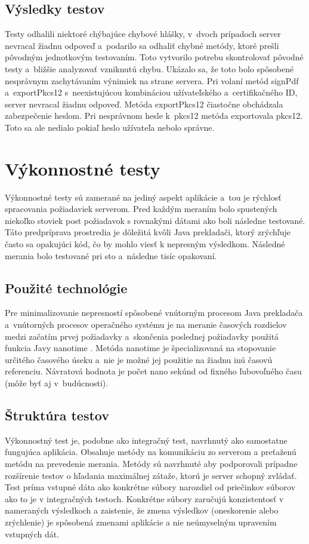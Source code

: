 \documentclass[
  digital, %
  table,   %
oneside,
  nolof,     %
  nolot,     %
]{fithesis3}
\begin{document}
\subsection{Výsledky testov}
Testy odhalili niektoré chýbajúce chybové hlášky, v~dvoch prípadoch server nevracal žiadnu odpoveď a~podarilo sa odhaliť chybné metódy, ktoré prešli pôvodným jednotkovým testovaním.
Toto vytvorilo potrebu skontrolovať pôvodné testy a~bližšie analyzovať vzniknutú chybu. Ukázalo sa, že toto bolo spôsobené nesprávnym zachytávaním výnimiek na strane servera.
Pri volaní metód signPdf a~exportPkcs12 s~neexistujúcou kombináciou užívateľského a~certifikačného ID, server nevracal žiadnu odpoveď. Metóda exportPkcs12 čiastočne obchádzala zabezpečenie heslom. Pri nesprávnom hesle k~pkcs12 metóda exportovala pkcs12. Toto sa ale nedialo pokiaľ heslo užívateľa nebolo správne.
\section{Výkonnostné testy}
Výkonnostné testy sú zamerané na jediný aspekt aplikácie a~tou je rýchlosť spracovania požiadaviek serverom. Pred každým meraním bolo spustených niekoľko stoviek post požiadavok s rovnakými dátami ako boli následne testované. Táto predpríprava prostredia je dôležitá kvôli Java prekladači, ktorý zrýchľuje často sa opakujúci kód, čo by mohlo viesť k nepresným výsledkom. Následné merania bolo  testované pri sto a~následne tisíc opakovaní.
\subsection{Použité technológie}
Pre minimalizovanie nepresností spôsobené vnútorným procesom Java prekladača a~vnútorných procesov operačného systému je na meranie časových rozdielov medzi začatím prvej požiadavky a~skončenia poslednej požiadavky použitá funkcia Javy nanotime \cite{systemNanotime}. Metóda nanotime je špecializovaná na stopovanie určitého časového úseku a~nie je možné jej použitie na žiadnu inú časovú referenciu. Návratová hodnota je počet nano sekúnd od fixného ľubovoľného času (môže byť aj v~budúcnosti).
\subsection{Štruktúra testov}
Výkonnostný test je, podobne ako integračný test, navrhnutý ako samostatne fungujúca aplikácia. Obsahuje metódy na komunikáciu zo serverom a preťaženú metódu na prevedenie merania. Metódy sú navrhnuté aby podporovali prípadne rozšírenie testov o hľadania maximálnej zátaže, ktorú je server schopný zvládať. Test príma vstupné dáta ako konkrétne súbory narozdiel od priečinkov súborov ako to je v integračných testoch. Konkrétne súbory zaručujú konzistentosť v nameraných výsledkoch a zaistenie, že zmena výsledkov (oneskorenie alebo zrýchlenie) je spôsobená zmenami aplikácie a nie neúmyselným upravením vstupných dát. \paragraph{}
\end{document}
